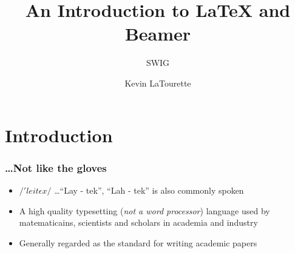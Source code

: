 \documentclass{beamer}
\title[Intro to \LaTeX]{An Introduction to LaTeX and Beamer}
\subtitle{SWIG}
\author{Kevin LaTourette}
\institute[University of Arizona]{Program in Applied Mathematics, University of Arizona}
\begin{document}
\begin{frame}
  \titlepage
\end{frame}


\section{Introduction}
\begin{frame}
   \frametitle{\ldots Not like the gloves}
   \begin{itemize}
      \item $/'leit\epsilon x/$ \ldots ``Lay - tek'', ``Lah - tek'' is also commonly spoken
      
      \item A high quality typesetting (\emph{not a word processor}) language used by matematicains, scientists and scholars in academia and industry
      
      \item Generally regarded as the standard for writing academic papers
   \end{itemize}

\end{frame}

\end{document}
